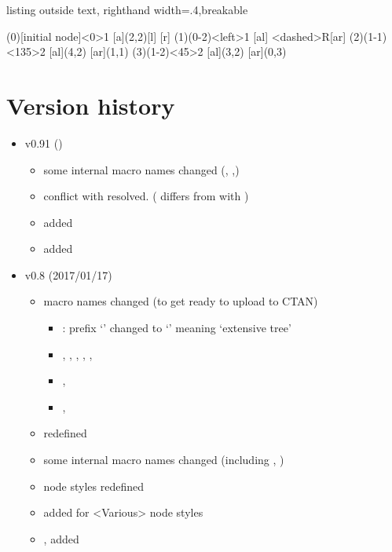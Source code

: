 \begin{tcblisting}{listing outside text, righthand width=.4\linewidth,breakable}
\begin{istgame}[>=stealth]
\xtdistance{15mm}{30mm}
\istroot[-135](0)[initial node]<0>{1}
  [a]{(2,2)}[l]
  [r]
\endist 
\istroot(1)(0-2)<left>{1}
  [al]
  \istb<dashed>{R}[ar]
\endist 
\xtdistance{10mm}{20mm}
\istroot(2)(1-1)<135>{2}
  [al]{(4,2)}
  [ar]{(1,1)}
\endist 
\istroot(3)(1-2)<45>{2}
  [al]{(3,2)}
  [ar]{(0,3)}
\endist 
\end{istgame}
\end{tcblisting}


\section{Version history}

\begin{itemize}
\item v0.91 (\tmpdate) 
  \begin{itemize}
  \item some internal macro names changed (\cmd{\xtnode}, \cmd{\xttnode},\cmd{\xtshowtnode})
  \item conflict with  resolved. ( differs from  with )
  \item \cmd{\setistnodeanchors} added
  \item {} added
  \end{itemize}
\item v0.8 (2017/01/17)
  \begin{itemize}
  \item macro names changed (to get ready to upload to CTAN)
    \begin{itemize}
      \item \cmd{\xtdistance}: prefix `' changed to `' meaning `extensive tree'
      \item \cmd{\xtInfoset(*)}, \cmd{\xtInfosetOwner}, \cmd{\xtActionLabel}, , \cmd{\xtPayoff}, \cmd{\xtNode}
      \item \cmd{\xtShowTerminalNodes}, \cmd{\xtHideTerminalNodes}
      \item \cmd{\xtlevdist}, \cmd{\xtsibdist}
    \end{itemize}
  \item \cmd{\xtNode} redefined
  \item some internal macro names changed (including \cmd{\xtpayff}, \cmd{\xtmove})
  \item node styles redefined
  \item {} added for <Various> node styles
  \item \cmd{\setistdefaultnodecolor},  added
  \end{itemize}
\end{itemize}


